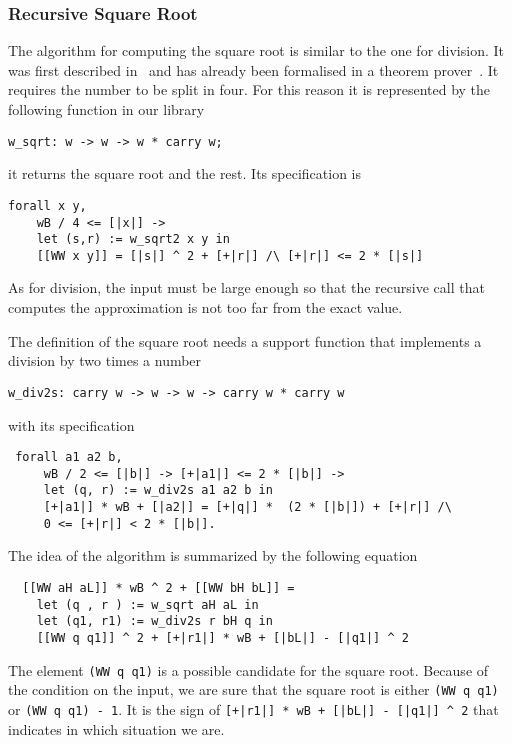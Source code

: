 \subsubsection{Recursive Square Root}

The algorithm for computing the square root is similar to the one for division.
It was first described in~\cite{RecSqrt} and has already been formalised in a 
theorem prover~\cite{BerMagZim02}. It requires the number to be split
in four. For this reason it is represented by the following function in our
library
\begin{verbatim}
w_sqrt: w -> w -> w * carry w;
\end{verbatim}
it returns the square root and the rest.
Its specification is
\begin{verbatim}
forall x y,
    wB / 4 <= [|x|] ->
    let (s,r) := w_sqrt2 x y in
    [[WW x y]] = [|s|] ^ 2 + [+|r|] /\ [+|r|] <= 2 * [|s|]
\end{verbatim}
As for division, the input must be large enough so that the recursive call
that computes the approximation is not too far from the exact value. 

The definition of the square root needs a support function that implements a division
by two times a number
\begin{verbatim}
w_div2s: carry w -> w -> w -> carry w * carry w
\end{verbatim}
with its specification
\begin{verbatim}
 forall a1 a2 b,
     wB / 2 <= [|b|] -> [+|a1|] <= 2 * [|b|] ->
     let (q, r) := w_div2s a1 a2 b in
     [+|a1|] * wB + [|a2|] = [+|q|] *  (2 * [|b|]) + [+|r|] /\ 
     0 <= [+|r|] < 2 * [|b|].
\end{verbatim}
The idea of the algorithm is summarized by the following equation
\begin{verbatim}
  [[WW aH aL]] * wB ^ 2 + [[WW bH bL]] =
    let (q , r ) := w_sqrt aH aL in
    let (q1, r1) := w_div2s r bH q in
    [[WW q q1]] ^ 2 + [+|r1|] * wB + [|bL|] - [|q1|] ^ 2 
\end{verbatim}
The element {\tt (WW q q1)} is a possible candidate
for the square root. Because of the condition on
the input, we are sure that the square root is either {\tt (WW q q1)} or
{\tt (WW q q1) - 1}. It is the sign of {\tt [+|r1|] * wB + 
[|bL|] - [|q1|] \^{} 2} that indicates in which situation we are. 